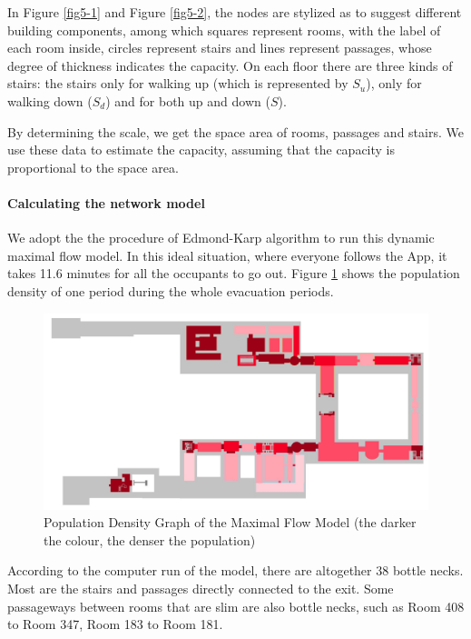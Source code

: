 \documentclass[a4paper,12pt]{article}
\begin{document}
In Figure \ref{fig5-1} and Figure \ref{fig5-2}, the nodes are stylized as to suggest different building components, among which squares represent rooms, with the label of each room inside, circles represent stairs and lines represent passages, whose degree of thickness indicates the capacity. On each floor there are three kinds of stairs: the stairs only for walking up (which is represented by $S_u$), only for walking down ($S_d$) and for both up and down ($S$).

By determining the scale, we get the space area of rooms, passages and stairs. We use these data to estimate the capacity, assuming that the capacity is proportional to the space area. 
\paragraph{Calculating the network model} We adopt the 
the procedure of Edmond-Karp algorithm to run this dynamic maximal flow model. In this ideal situation, where everyone follows the App, it takes 11.6 minutes for all the occupants to go out. Figure \ref{fig5-3} shows the population density of one period during the whole evacuation periods.

\begin{figure} [H]
\centering
\includegraphics[width=15cm]{1234.jpg}
\caption{Population Density Graph of the Maximal Flow Model (the darker the colour, the denser the population)}
\label{fig5-3}
\end{figure}
According to the computer run of the model, there are altogether 38 bottle necks. Most are the stairs and passages directly connected to the exit. Some passageways between rooms that are slim are also bottle necks, such as Room 408 to Room 347, Room 183 to Room 181.
\end{document}
